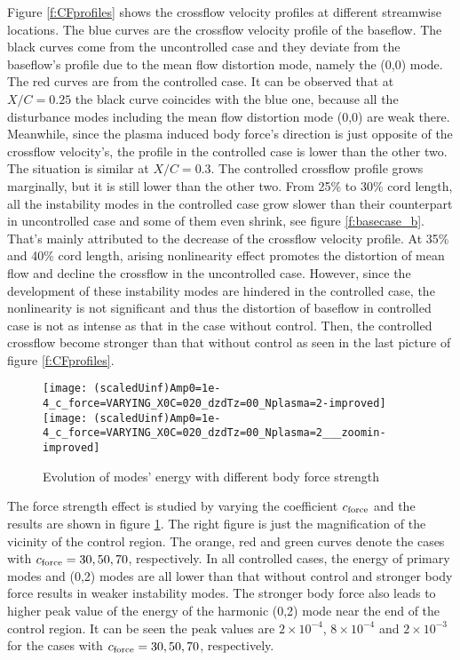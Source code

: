 \documentclass{AIAA}
\begin{document}
Figure \ref{f:CFprofiles} shows the crossflow velocity profiles at different streamwise locations. The blue curves are the crossflow velocity profile of the baseflow. The black curves come from the uncontrolled case and they deviate from the baseflow's profile due to the mean flow distortion mode, namely the (0,0) mode. The red curves are from the controlled case. It can be observed that at $X/C=0.25$ the black curve coincides with the blue one, because all the disturbance modes including the mean flow distortion mode (0,0) are weak there. Meanwhile, since the plasma induced body force's direction is just opposite of the crossflow velocity's, the profile in the controlled case is lower than the other two. The situation is similar at $X/C=0.3$. The controlled crossflow profile grows marginally, but it is still lower than the other two. From 25\% to 30\% cord length, all the instability modes in the controlled case grow slower than their counterpart in uncontrolled case and some of them even shrink, see figure \ref{f:basecase_b}. That's mainly attributed to the decrease of the crossflow velocity profile. At 35\% and 40\% cord length, arising nonlinearity effect promotes the distortion of mean flow and decline the crossflow in the uncontrolled case. However, since the development of these instability modes are hindered in the controlled case, the nonlinearity is not significant and thus the distortion of baseflow in controlled case is not as intense as that in the case without control. Then, the controlled crossflow become stronger than that without control as seen in the last picture of figure \ref{f:CFprofiles}.
\begin{figure}
\centering
\texttt{[image: (scaledUinf)Amp0=1e-4\_c\_force=VARYING\_X0C=020\_dzdTz=00\_Nplasma=2-improved]}
\texttt{[image: (scaledUinf)Amp0=1e-4\_c\_force=VARYING\_X0C=020\_dzdTz=00\_Nplasma=2\_\_\_zoomin-improved]}
\caption{Evolution of modes' energy with different body force strength}%
\label{f:forcestrength}
\end{figure}

The force strength effect is studied by varying the coefficient $c_{\rm force}$ and the results are shown in figure \ref{f:forcestrength}. The right figure is just the magnification of the vicinity of the control region. The orange, red and green curves denote the cases with $c_{\rm force}=30,50,70$, respectively. In all controlled cases, the energy of primary modes and (0,2) modes are all lower than that without control and stronger body force results in weaker instability modes. The stronger body force also leads to higher peak value of the energy of the harmonic (0,2) mode near the end of the control region. It can be seen the peak values are $2 \times 10^{-4}$, $8 \times 10^{-4}$ and  $2 \times 10^{-3}$ for the cases with $c_{\rm force}=30,50,70$, respectively.
\end{document}
